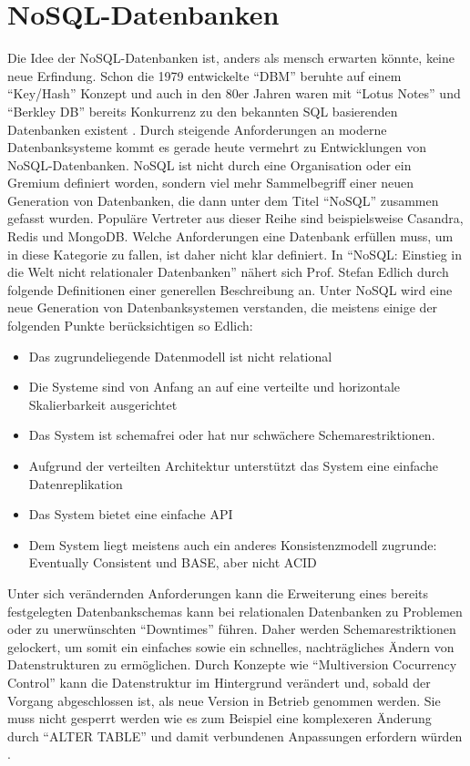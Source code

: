\documentclass[a4paper,11pt,oneside,%
headsepline,												%
footsepline,												%
bibtotocnumbered									%
]{scrreprt}
\begin{document}
\section{NoSQL-Datenbanken}
Die Idee der NoSQL-Datenbanken ist, anders als mensch erwarten könnte, keine neue Erfindung. Schon die 1979 entwickelte \enquote{DBM} beruhte auf einem \enquote{Key/Hash} Konzept und auch in den 80er Jahren waren mit \enquote{Lotus Notes} und \enquote{Berkley DB} bereits Konkurrenz zu den bekannten SQL basierenden Datenbanken existent \autocite[1]{Edlich2010}. Durch steigende Anforderungen an moderne Datenbanksysteme kommt es gerade heute vermehrt zu Entwicklungen von NoSQL-Datenbanken. NoSQL ist nicht durch eine Organisation oder ein Gremium definiert worden, sondern viel mehr Sammelbegriff einer neuen Generation von Datenbanken, die dann unter dem Titel \enquote{NoSQL} zusammen gefasst wurden. Populäre Vertreter aus dieser Reihe sind beispielsweise Casandra, Redis und MongoDB. Welche Anforderungen eine Datenbank erfüllen muss, um in diese Kategorie zu fallen, ist daher nicht klar definiert. In \enquote{NoSQL: Einstieg in die Welt nicht relationaler Datenbanken} nähert sich Prof. Stefan Edlich durch folgende Definitionen  einer generellen Beschreibung an. Unter NoSQL wird eine neue Generation von Datenbanksystemen verstanden, die meistens einige der folgenden Punkte berücksichtigen so Edlich\autocite[2]{Edlich2010}:
\begin{itemize}
		\item Das zugrundeliegende Datenmodell ist nicht relational
		\item Die Systeme sind von Anfang an auf eine verteilte und horizontale Skalierbarkeit ausgerichtet
		\item Das System ist schemafrei oder hat nur schwächere Schemarestriktionen.
		\item Aufgrund der verteilten Architektur unterstützt das System eine einfache Datenreplikation
		\item Das System bietet eine einfache API
		\item Dem System liegt meistens auch ein anderes Konsistenzmodell zugrunde: Eventually Consistent und BASE, aber nicht ACID
\end{itemize}
Unter sich verändernden Anforderungen kann die Erweiterung eines bereits festgelegten Datenbankschemas kann bei relationalen Datenbanken zu Problemen oder zu unerwünschten \enquote{Downtimes} führen. Daher werden Schemarestriktionen gelockert, um somit ein einfaches sowie ein schnelles, nachträgliches Ändern von Datenstrukturen zu ermöglichen. Durch Konzepte wie \enquote{Multiversion Cocurrency Control} kann die Datenstruktur im Hintergrund verändert und, sobald der Vorgang abgeschlossen ist, als neue Version in Betrieb genommen werden. Sie muss nicht gesperrt werden wie es zum Beispiel eine komplexeren Änderung durch \enquote{ALTER TABLE} und damit verbundenen Anpassungen erfordern würden \autocite[3, 40]{Edlich2010}.\\
\end{document}

